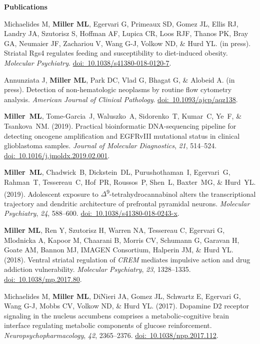 \documentclass[10pt]{article}
\begin{document}
\vspace{0.1in}
{\large \textbf{Publications}}

\begin{description}

\item Michaelides M, \textbf{Miller ML}, Egervari G, Primeaux SD, Gomez JL, Ellis RJ, Landry JA, Szutorisz S, Hoffman AF, Lupica CR, Loos RJF, Thanos PK, Bray GA, Neumaier JF, Zachariou V, Wang G-J, Volkow ND, \& Hurd YL. (in press). Striatal Rgs4 regulates feeding and susceptibility to diet-induced obesity. \textit{Molecular Psychiatry}. \href{https://doi.org/10.1038/s41380-018-0120-7}{doi:~10.1038/s41380-018-0120-7}.
\item Annunziata J, \textbf{Miller ML}, Park DC, Vlad G, Bhagat G, \& Alobeid A. (in press). Detection of non-hematologic neoplasms by routine flow cytometry analysis. \textit{American Journal of Clinical Pathology}. \href{https://doi.org/10.1093/ajcp/aqz138}{doi:~10.1093/ajcp/aqz138}.
\item \textbf{Miller~ML}, Tome-Garcia~J, Waluszko~A, Sidorenko~T, Kumar~C, Ye~F, \& Tsankova~NM. (2019). Practical bioinformatic DNA-sequencing pipeline for detecting oncogene amplification and EGFRvIII mutational status in clinical glioblastoma samples. \textit{Journal of Molecular Diagnostics}, \textit{21}, 514--524. \href{https://doi.org/10.1016/j.jmoldx.2019.02.001}{doi:~10.1016/j.jmoldx.2019.02.001}.
\item \textbf{Miller~ML}, Chadwick~B, Dickstein~DL, Purushothaman~I, Egervari~G, Rahman~T, Tessereau~C, Hof~PR, Roussos~P, Shen~L, Baxter~MG, \& Hurd~YL. (2019). Adolescent exposure to $\Delta$\textsuperscript{9}-tetrahydrocannabinol alters the transcriptional trajectory and dendritic architecture of prefrontal pyramidal neurons. \textit{Molecular Psychiatry}, \textit{24}, 588--600. \href{https://doi.org/10.1038/s41380-018-0243-x}{doi:~10.1038/s41380-018-0243-x}.
\item \textbf{Miller ML}, Ren Y, Szutorisz H, Warren NA, Tessereau C, Egervari G, Mlodnicka A, Kapoor M, Chaarani B, Morris CV, Schumann G, Garavan H, Goate AM, Bannon MJ, IMAGEN Consortium, Halperin JM, \& Hurd YL. (2018). Ventral striatal regulation of \textit{CREM} mediates impulsive action and drug addiction vulnerability. \textit{Molecular Psychiatry}, \textit{23}, 1328--1335. \href{https://doi.org/10.1038/mp.2017.80}{doi:~10.1038/mp.2017.80}.
\item Michaelides M, \textbf{Miller ML}, DiNieri JA, Gomez JL, Schwartz E, Egervari G, Wang G-J, Mobbs CV, Volkow ND, \& Hurd YL. (2017). Dopamine D2 receptor signaling in the nucleus accumbens comprises a metabolic-cognitive brain interface regulating metabolic components of glucose reinforcement. \textit{Neuropsychopharmacology}, \textit{42}, 2365--2376. \href{https://doi.org/10.1038/npp.2017.112}{doi:~10.1038/npp.2017.112}.

\end{description}
\end{document}
